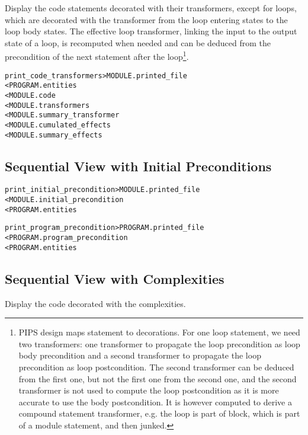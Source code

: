 \documentclass[a4paper]{report}
\newenvironment{PipsMake}{\begin{alltt}}{\end{alltt}}
\begin{document}
Display the code statements decorated with their transformers, except
for loops, which are decorated with the transformer from the loop
entering states to the loop body states. The effective loop
transformer, linking the input to the output state of a loop, is
recomputed when needed and can be deduced from the precondition of the
next statement after the loop\footnote{PIPS design maps statement to
  decorations. For one loop statement, we need two transformers: one
  transformer to propagate the loop precondition as loop body
  precondition and a second transformer to propagate the loop
  precondition as loop postcondition. The second transformer can be
  deduced from the first one, but not the first one from the second
  one, and the second transformer is not used to compute the loop
  postcondition as it is more accurate to use the body
  postcondition. It is however computed to derive a compound statement
  transformer, e.g. the loop is part of block, which is part of a
  module statement, and then junked.}.

\begin{PipsMake}
print_code_transformers         > MODULE.printed_file
        < PROGRAM.entities
        < MODULE.code
        < MODULE.transformers
        < MODULE.summary_transformer
        < MODULE.cumulated_effects
        < MODULE.summary_effects
\end{PipsMake}

\subsection{Sequential View with Initial Preconditions}

\begin{PipsMake}
print_initial_precondition  > MODULE.printed_file
        < MODULE.initial_precondition
        < PROGRAM.entities

print_program_precondition  > PROGRAM.printed_file
        < PROGRAM.program_precondition
        < PROGRAM.entities
\end{PipsMake}

\subsection{Sequential View with Complexities}

Display the code decorated with the complexities.
\end{document}
